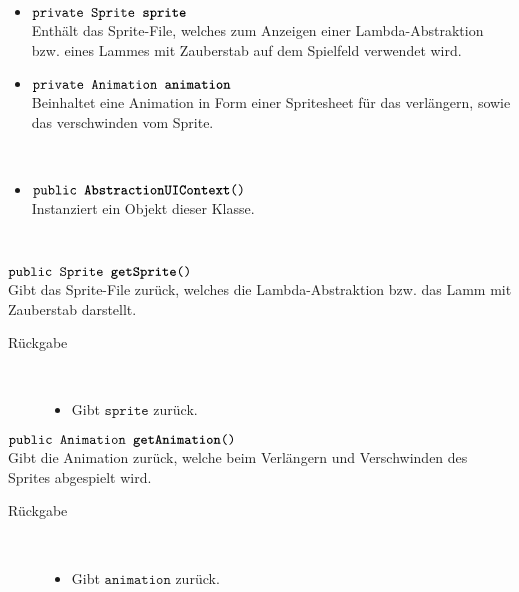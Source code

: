 \begin{description}
\item[Beschreibung] \hfill \\ 
\item[Attribute] \hfill \\
	\vspace{-.8cm}
	\begin{itemize}	
		\item $\texttt{private Sprite \textbf{sprite}}$ \\ Enthält das Sprite-File, welches zum Anzeigen einer Lambda-Abstraktion bzw. eines Lammes mit Zauberstab auf dem Spielfeld verwendet wird.
		\item $\texttt{private Animation \textbf{animation}}$ \\ Beinhaltet eine Animation in Form einer Spritesheet für das verlängern, sowie das verschwinden vom Sprite.
		\end{itemize}
	
\item[Konstruktoren] \hfill \\
	\vspace{-.8cm}
	\begin{itemize}
		\item $\texttt{public \textbf{AbstractionUIContext}()}$ \\ Instanziert ein Objekt dieser Klasse.

	\end{itemize}
	
\item[Methoden] \hfill \\
	\vspace{-.8cm}
		\item $\texttt{public Sprite \textbf{getSprite}()}$ \\ Gibt das Sprite-File zurück, welches die Lambda-Abstraktion bzw. das Lamm mit Zauberstab darstellt.
		\begin{description}
			\item[Rückgabe] \hfill \\
			\vspace{-.8cm}
			\begin{itemize}
				\item Gibt $\texttt{sprite}$ zurück.
			\end{itemize}
			\end{description}
			
		\item $\texttt{public Animation \textbf{getAnimation}()}$ \\ Gibt die Animation zurück, welche beim Verlängern und Verschwinden des Sprites abgespielt wird.
		\begin{description}
			\item[Rückgabe] \hfill \\
			\vspace{-.8cm}
			\begin{itemize}
				\item Gibt $\texttt{animation}$ zurück.
			\end{itemize}
			\end{description}
			
			
			
	\end{description}	

